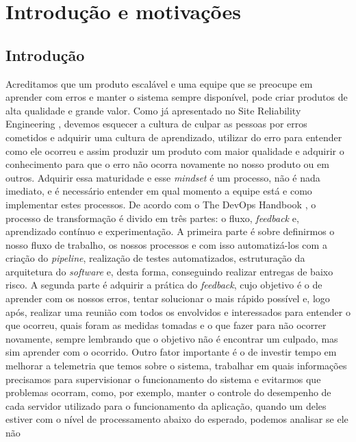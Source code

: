 \part{Introdução e motivações}
  \chapter{Introdução}
    Acreditamos que um produto escalável e uma equipe que se preocupe em aprender
    com erros e manter o sistema sempre disponível, pode criar produtos de alta
    qualidade e grande valor. Como já apresentado no Site Reliability Engineering
    \cite{SiteReliabilityEngineering}, devemos esquecer a cultura de culpar as
    pessoas por erros cometidos e adquirir uma cultura de aprendizado, utilizar
    do erro para entender como ele ocorreu e assim produzir um produto com maior
    qualidade e adquirir o conhecimento para que o erro não ocorra novamente no
    nosso produto ou em outros. Adquirir essa maturidade e esse \textit{mindset}
    é um processo, não é nada imediato, e é necessário entender em qual momento
    a equipe está e como implementar estes processos. \newline
    De acordo com o The DevOps Handbook \cite{TheDevOpsHandbook}, o processo de
    transformação é divido em três partes: o fluxo, \textit{feedback} e, aprendizado
    contínuo e experimentação. A primeira parte é sobre definirmos o nosso fluxo
    de trabalho, os nossos processos e com isso automatizá-los com a criação do
    \textit{pipeline}, realização de testes automatizados, estruturação da arquitetura
    do \textit{software} e, desta forma, conseguindo realizar entregas de baixo
    risco. A segunda parte é adquirir a prática do \textit{feedback}, cujo objetivo
    é o de aprender com os nossos erros, tentar solucionar o mais rápido possível
    e, logo após, realizar uma reunião com todos os envolvidos e interessados para
    entender o que ocorreu, quais foram as medidas tomadas e o que fazer para não
    ocorrer novamente, sempre lembrando que o objetivo não é encontrar um culpado,
    mas sim aprender com o ocorrido. Outro fator importante é o de investir tempo
    em melhorar a telemetria que temos sobre o sistema, trabalhar em quais informações
    precisamos para supervisionar o funcionamento do sistema e evitarmos que
    problemas ocorram, como, por exemplo, manter o controle do desempenho de cada
    servidor utilizado para o funcionamento da aplicação, quando um deles estiver
    com o nível de processamento abaixo do esperado, podemos analisar se ele não
